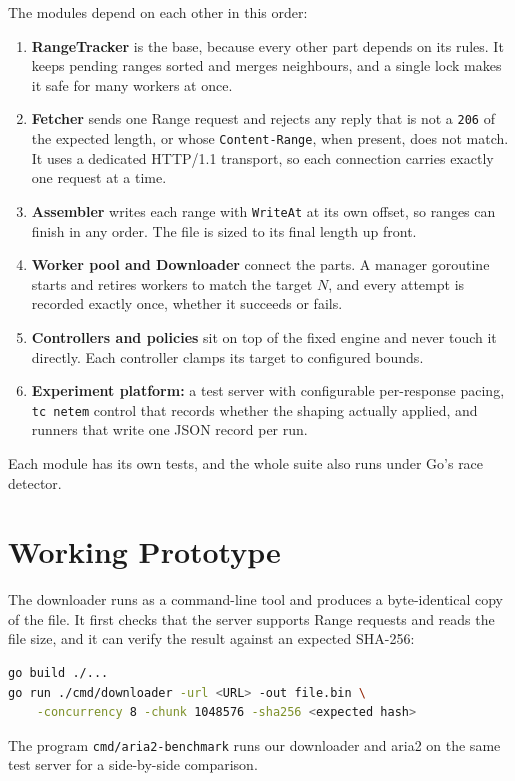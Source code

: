 \documentclass[11pt,a4paper]{report}
\newcommand{\code}[1]{\texttt{#1}}
\begin{document}
The modules depend on each other in this order:
\begin{enumerate}
\item \textbf{RangeTracker} is the base, because every other part depends on its rules. It keeps pending ranges sorted and merges neighbours, and a single lock makes it safe for many workers at once.
\item \textbf{Fetcher} sends one Range request and rejects any reply that is not a \code{206} of the expected length, or whose \code{Content-Range}, when present, does not match. It uses a dedicated HTTP/1.1 transport, so each connection carries exactly one request at a time.
\item \textbf{Assembler} writes each range with \code{WriteAt} at its own offset, so ranges can finish in any order. The file is sized to its final length up front.
\item \textbf{Worker pool and Downloader} connect the parts. A manager goroutine starts and retires workers to match the target $N$, and every attempt is recorded exactly once, whether it succeeds or fails.
\item \textbf{Controllers and policies} sit on top of the fixed engine and never touch it directly. Each controller clamps its target to configured bounds.
\item \textbf{Experiment platform:} a test server with configurable per-response pacing, \code{tc netem} control that records whether the shaping actually applied, and runners that write one JSON record per run.
\end{enumerate}
Each module has its own tests, and the whole suite also runs under Go's race detector.

\chapter{Working Prototype}
The downloader runs as a command-line tool and produces a byte-identical copy of the file. It first checks that the server supports Range requests and reads the file size, and it can verify the result against an expected SHA-256:
\begin{lstlisting}[language=bash]
go build ./...
go run ./cmd/downloader -url <URL> -out file.bin \
    -concurrency 8 -chunk 1048576 -sha256 <expected hash>
\end{lstlisting}
The program \code{cmd/aria2-benchmark} runs our downloader and aria2 on the same test server for a side-by-side comparison.
\end{document}
